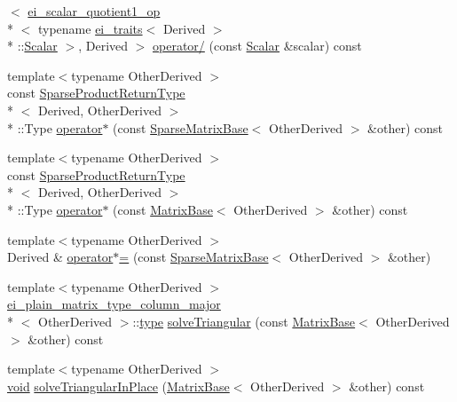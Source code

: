 \begin{DoxyCompactItemize}
$<$ \hyperlink{structei__scalar__quotient1__op}{ei\-\_\-scalar\-\_\-quotient1\-\_\-op}\\*
$<$ typename \hyperlink{structei__traits}{ei\-\_\-traits}$<$ Derived $>$\\*
\-::\hyperlink{class_sparse_matrix_base_af39d70f2b7e775e9e17b666cd24128c8}{Scalar} $>$, Derived $>$ \hyperlink{class_sparse_matrix_base_a389ba4958056fc69628cdd8fa8139ebf}{operator/} (const \hyperlink{class_sparse_matrix_base_af39d70f2b7e775e9e17b666cd24128c8}{Scalar} \&scalar) const 
\item 
{\footnotesize template$<$typename Other\-Derived $>$ }\\const \hyperlink{struct_sparse_product_return_type}{Sparse\-Product\-Return\-Type}\\*
$<$ Derived, Other\-Derived $>$\\*
\-::Type \hyperlink{class_sparse_matrix_base_a2de2d9efef54795656c3dfe5115937fc}{operator$\ast$} (const \hyperlink{class_sparse_matrix_base}{Sparse\-Matrix\-Base}$<$ Other\-Derived $>$ \&other) const 
\item 
{\footnotesize template$<$typename Other\-Derived $>$ }\\const \hyperlink{struct_sparse_product_return_type}{Sparse\-Product\-Return\-Type}\\*
$<$ Derived, Other\-Derived $>$\\*
\-::Type \hyperlink{class_sparse_matrix_base_a4a400483919cbd21ac3fbd0784889577}{operator$\ast$} (const \hyperlink{class_matrix_base}{Matrix\-Base}$<$ Other\-Derived $>$ \&other) const 
\item 
{\footnotesize template$<$typename Other\-Derived $>$ }\\Derived \& \hyperlink{class_sparse_matrix_base_a10a67f96c423246e274d0a0d3521b5e7}{operator$\ast$=} (const \hyperlink{class_sparse_matrix_base}{Sparse\-Matrix\-Base}$<$ Other\-Derived $>$ \&other)
\item 
{\footnotesize template$<$typename Other\-Derived $>$ }\\\hyperlink{structei__plain__matrix__type__column__major}{ei\-\_\-plain\-\_\-matrix\-\_\-type\-\_\-column\-\_\-major}\\*
$<$ Other\-Derived $>$\-::\hyperlink{glext_8h_a7d05960f4f1c1b11f3177dc963a45d86}{type} \hyperlink{class_sparse_matrix_base_a3011b87f5dd1c99c3efff57a1800bf68}{solve\-Triangular} (const \hyperlink{class_matrix_base}{Matrix\-Base}$<$ Other\-Derived $>$ \&other) const 
\item 
{\footnotesize template$<$typename Other\-Derived $>$ }\\\hyperlink{group___u_a_v_objects_plugin_ga444cf2ff3f0ecbe028adce838d373f5c}{void} \hyperlink{class_sparse_matrix_base_a381f890e85da0fc92ee5a5080feee00c}{solve\-Triangular\-In\-Place} (\hyperlink{class_matrix_base}{Matrix\-Base}$<$ Other\-Derived $>$ \&other) const 

\end{DoxyCompactItemize}
